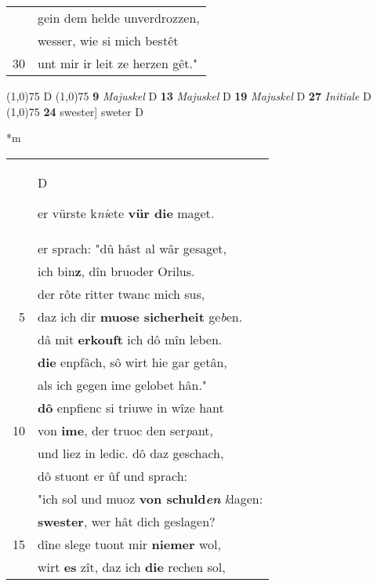 \documentclass[8pt,a4paper,notitlepage]{article}
\begin{document}
\begin{table}[ht]
\begin{minipage}[t]{0.5\linewidth}
\begin{tabular}{rl}
 & gein dem helde unverdrozzen,\\ 
 & wesser, wie si mich bestêt\\ 
30 & unt mir ir leit ze herzen gêt."\\ 
\end{tabular}
\scriptsize
\line(1,0){75} \newline
D \newline
\line(1,0){75} \newline
\textbf{9} \textit{Majuskel} D  \textbf{13} \textit{Majuskel} D  \textbf{19} \textit{Majuskel} D  \textbf{27} \textit{Initiale} D  \newline
\line(1,0){75} \newline
\textbf{24} swester] sweter D \newline
\end{minipage}
\hspace{0.5cm}
\begin{minipage}[t]{0.5\linewidth}
\small
\begin{center}*m
\end{center}
\begin{tabular}{rl}
 & \begin{large}D\end{large}er vürste k\textit{ni}ete \textbf{vür die} maget.\\ 
 & er sprach: "dû hâst al wâr gesaget,\\ 
 & ich bin\textbf{z}, dîn bruoder Orilus.\\ 
 & der rôte ritter twanc mich sus,\\ 
5 & daz ich dir \textbf{muose sicherheit} ge\textit{b}en.\\ 
 & dâ mit \textbf{erkouft} ich dô mîn leben.\\ 
 & \textbf{die} enpfâch, sô wirt hie gar getân,\\ 
 & als ich gegen ime gelobet hân."\\ 
 & \textbf{dô} enpfienc si triuwe in wîze hant\\ 
10 & von \textbf{ime}, der truoc den ser\textit{p}ant,\\ 
 & und liez in ledic. dô daz geschach,\\ 
 & dô stuont er ûf und sprach:\\ 
 & "ich sol und muoz \textbf{von schuld\textit{en}} \textit{k}lagen:\\ 
 & \textbf{swester}, wer hât dich geslagen?\\ 
15 & dîne slege tuont mir \textbf{niemer} wol,\\ 
 & wirt \textbf{es} zît, daz ich \textbf{die} rechen sol,\\ 

\end{tabular}
\end{minipage}
\end{table}
\end{document}
